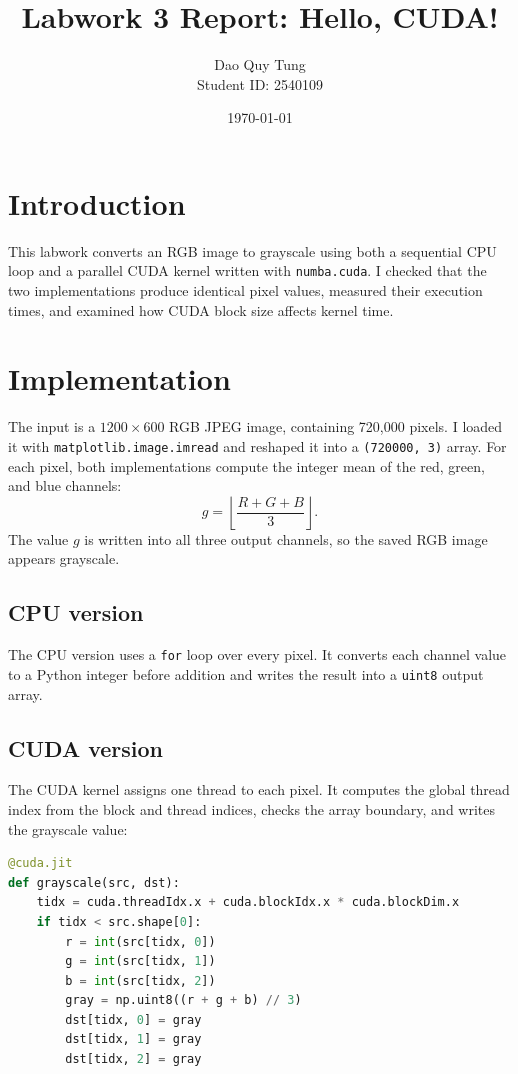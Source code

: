 \documentclass[12pt,a4paper]{article}
\title{Labwork 3 Report: Hello, CUDA!}
\author{Dao Quy Tung \\ Student ID: 2540109}
\date{\today}
\begin{document}
\maketitle

\section{Introduction}
This labwork converts an RGB image to grayscale using both a sequential CPU loop and a parallel CUDA kernel written with \texttt{numba.cuda}. I checked that the two implementations produce identical pixel values, measured their execution times, and examined how CUDA block size affects kernel time.

\section{Implementation}
The input is a $1200\times600$ RGB JPEG image, containing 720,000 pixels. I loaded it with \texttt{matplotlib.image.imread} and reshaped it into a \texttt{(720000, 3)} array. For each pixel, both implementations compute the integer mean of the red, green, and blue channels:
\begin{equation}
g=\left\lfloor\frac{R+G+B}{3}\right\rfloor.
\end{equation}
The value $g$ is written into all three output channels, so the saved RGB image appears grayscale.

\subsection{CPU version}
The CPU version uses a \texttt{for} loop over every pixel. It converts each channel value to a Python integer before addition and writes the result into a \texttt{uint8} output array.

\subsection{CUDA version}
The CUDA kernel assigns one thread to each pixel. It computes the global thread index from the block and thread indices, checks the array boundary, and writes the grayscale value:

\begin{lstlisting}[language=Python,basicstyle=\ttfamily\small,breaklines=true]
@cuda.jit
def grayscale(src, dst):
    tidx = cuda.threadIdx.x + cuda.blockIdx.x * cuda.blockDim.x
    if tidx < src.shape[0]:
        r = int(src[tidx, 0])
        g = int(src[tidx, 1])
        b = int(src[tidx, 2])
        gray = np.uint8((r + g + b) // 3)
        dst[tidx, 0] = gray
        dst[tidx, 1] = gray
        dst[tidx, 2] = gray
\end{lstlisting}
\end{document}
